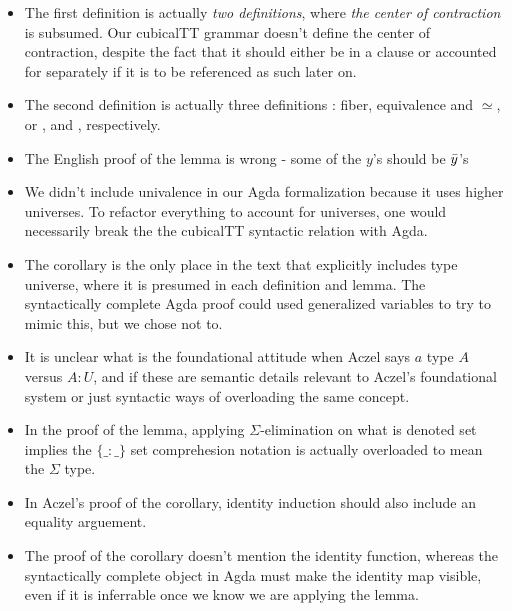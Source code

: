 \begin{itemize}

\item The first definition is actually \emph{two definitions}, where \emph{the
center of contraction} is subsumed. Our cubicalTT grammar doesn't define the
center of contraction, despite the fact that it should either be in a 
clause or accounted for separately if it is to be referenced as such later on.

\item The second definition is actually three definitions : fiber, equivalence
and $\simeq$, or ,  and , respectively.

\item The English proof of the lemma is wrong - some of the $y$'s should be $\bar{ y }$'s

\item We didn't include univalence in our Agda formalization because it uses
higher universes. To refactor everything to account for universes, one would
necessarily break the the cubicalTT syntactic relation with Agda.

\item The corollary is the only place in the text that explicitly includes type
universe, where it is presumed in each definition and lemma. The syntactically
complete Agda proof could used generalized variables to try to mimic this, but
we chose not to.

\item It is unclear what is the foundational attitude when Aczel says
$a$ type $A$ versus $A : U$, and if these are semantic details relevant to
Aczel's foundational system or just syntactic ways of overloading the same
concept.

\item In the proof of the lemma, applying $\Sigma$-elimination on what is
denoted set implies the $\{\_ {:} \_\}$ set comprehesion notation is actually overloaded to
mean the $\Sigma$ type.

\item In Aczel's proof of the corollary, identity induction should also include an
equality arguement.

\item The proof of the corollary doesn't mention the identity function, whereas
the syntactically complete object in Agda must make the identity map visible,
even if it is inferrable once we know we are applying the lemma.

\end{itemize}

